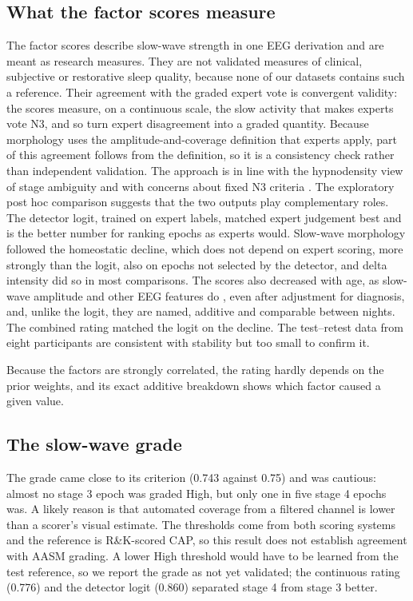 \subsection{What the factor scores measure}
The factor scores describe slow-wave strength in one EEG derivation and are meant as research measures. They are not validated measures of clinical, subjective or restorative sleep quality, because none of our datasets contains such a reference. Their agreement with the graded expert vote is convergent validity: the scores measure, on a continuous scale, the slow activity that makes experts vote N3, and so turn expert disagreement into a graded quantity. Because morphology uses the amplitude-and-coverage definition that experts apply, part of this agreement follows from the definition, so it is a consistency check rather than independent validation. The approach is in line with the hypnodensity view of stage ambiguity \cite{bakker2023ambiguity,huijben2023hypnodensity} and with concerns about fixed N3 criteria \cite{davidson2025n3}. The exploratory post hoc comparison suggests that the two outputs play complementary roles. The detector logit, trained on expert labels, matched expert judgement best and is the better number for ranking epochs as experts would. Slow-wave morphology followed the homeostatic decline, which does not depend on expert scoring, more strongly than the logit, also on epochs not selected by the detector, and delta intensity did so in most comparisons. The scores also decreased with age, as slow-wave amplitude and other EEG features do \cite{rosinvil2021age,mai2025aisleep}, even after adjustment for diagnosis, and, unlike the logit, they are named, additive and comparable between nights. The combined rating matched the logit on the decline. The test--retest data from eight participants are consistent with stability but too small to confirm it. %

Because the factors are strongly correlated, the rating hardly depends on the prior weights, and its exact additive breakdown shows which factor caused a given value. %

\subsection{The slow-wave grade}
The grade came close to its criterion (0.743 against 0.75) and was cautious: almost no stage 3 epoch was graded High, but only one in five stage 4 epochs was. A likely reason is that automated coverage from a filtered channel is lower than a scorer's visual estimate. The thresholds come from both scoring systems and the reference is R\&K-scored CAP, so this result does not establish agreement with AASM grading. A lower High threshold would have to be learned from the test reference, so we report the grade as not yet validated; the continuous rating (0.776) and the detector logit (0.860) separated stage 4 from stage 3 better. %

